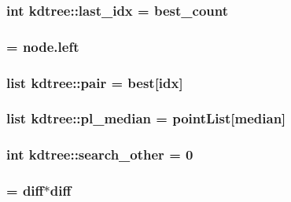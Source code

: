 \label{namespacekdtree_a8ae4f604fa3b331f0e1857ef7988dbed}
\hypertarget{namespacekdtree_a0e2b4f0710247ad4a1bc44217b669f98}{
\subsubsection[{last\_\-idx}]{\setlength{\rightskip}{0pt plus 5cm}int {\bf kdtree::last\_\-idx} = {\bf best\_\-count}}}
\label{namespacekdtree_a0e2b4f0710247ad4a1bc44217b669f98}
\hypertarget{namespacekdtree_a0ba21301aea56f1c2ef165f16bcc6af6}{
\subsubsection[{near}]{ = node.left}}
\label{namespacekdtree_a0ba21301aea56f1c2ef165f16bcc6af6}
\hypertarget{namespacekdtree_a2c9210668756589c874996518e7c43dc}{
\subsubsection[{pair}]{\setlength{\rightskip}{0pt plus 5cm}list {\bf kdtree::pair} = best\mbox{[}idx\mbox{]}}}
\label{namespacekdtree_a2c9210668756589c874996518e7c43dc}
\hypertarget{namespacekdtree_a68dd1b5c2ca51036f48cfb773ef665ac}{
\subsubsection[{pl\_\-median}]{\setlength{\rightskip}{0pt plus 5cm}list {\bf kdtree::pl\_\-median} = pointList\mbox{[}median\mbox{]}}}
\label{namespacekdtree_a68dd1b5c2ca51036f48cfb773ef665ac}
\hypertarget{namespacekdtree_a697ad02b362c4958d0497573757a329a}{
\subsubsection[{search\_\-other}]{\setlength{\rightskip}{0pt plus 5cm}int {\bf kdtree::search\_\-other} = 0}}
\label{namespacekdtree_a697ad02b362c4958d0497573757a329a}
\hypertarget{namespacekdtree_aa6b03574baf9af70ad70c383f1276f53}{
\subsubsection[{sq\_\-diff}]{ = {\bf diff}$\ast${\bf diff}}}
\label{namespacekdtree_aa6b03574baf9af70ad70c383f1276f53}
